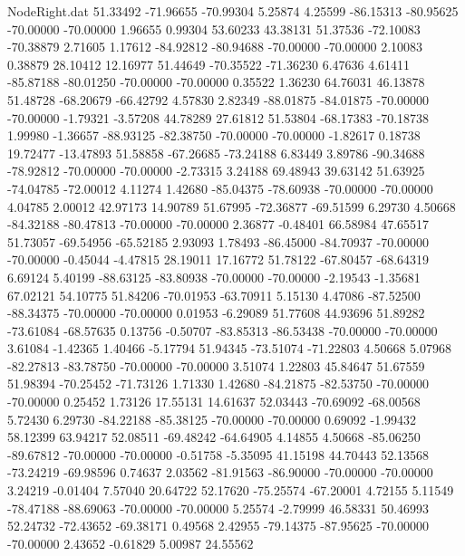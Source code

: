 \begin{filecontents}{NodeRight.dat}
  51.33492  -71.96655  -70.99304     5.25874    4.25599  -86.15313  -80.95625  -70.00000  -70.00000    1.96655    0.99304   53.60233   43.38131
  51.37536  -72.10083  -70.38879     2.71605    1.17612  -84.92812  -80.94688  -70.00000  -70.00000    2.10083    0.38879   28.10412   12.16977
  51.44649  -70.35522  -71.36230     6.47636    4.61411  -85.87188  -80.01250  -70.00000  -70.00000    0.35522    1.36230   64.76031   46.13878
  51.48728  -68.20679  -66.42792     4.57830    2.82349  -88.01875  -84.01875  -70.00000  -70.00000   -1.79321   -3.57208   44.78289   27.61812
  51.53804  -68.17383  -70.18738     1.99980   -1.36657  -88.93125  -82.38750  -70.00000  -70.00000   -1.82617    0.18738   19.72477  -13.47893
  51.58858  -67.26685  -73.24188     6.83449    3.89786  -90.34688  -78.92812  -70.00000  -70.00000   -2.73315    3.24188   69.48943   39.63142
  51.63925  -74.04785  -72.00012     4.11274    1.42680  -85.04375  -78.60938  -70.00000  -70.00000    4.04785    2.00012   42.97173   14.90789
  51.67995  -72.36877  -69.51599     6.29730    4.50668  -84.32188  -80.47813  -70.00000  -70.00000    2.36877   -0.48401   66.58984   47.65517
  51.73057  -69.54956  -65.52185     2.93093    1.78493  -86.45000  -84.70937  -70.00000  -70.00000   -0.45044   -4.47815   28.19011   17.16772
  51.78122  -67.80457  -68.64319     6.69124    5.40199  -88.63125  -83.80938  -70.00000  -70.00000   -2.19543   -1.35681   67.02121   54.10775
  51.84206  -70.01953  -63.70911     5.15130    4.47086  -87.52500  -88.34375  -70.00000  -70.00000    0.01953   -6.29089   51.77608   44.93696
  51.89282  -73.61084  -68.57635     0.13756   -0.50707  -83.85313  -86.53438  -70.00000  -70.00000    3.61084   -1.42365    1.40466   -5.17794
  51.94345  -73.51074  -71.22803     4.50668    5.07968  -82.27813  -83.78750  -70.00000  -70.00000    3.51074    1.22803   45.84647   51.67559
  51.98394  -70.25452  -71.73126     1.71330    1.42680  -84.21875  -82.53750  -70.00000  -70.00000    0.25452    1.73126   17.55131   14.61637
  52.03443  -70.69092  -68.00568     5.72430    6.29730  -84.22188  -85.38125  -70.00000  -70.00000    0.69092   -1.99432   58.12399   63.94217
  52.08511  -69.48242  -64.64905     4.14855    4.50668  -85.06250  -89.67812  -70.00000  -70.00000   -0.51758   -5.35095   41.15198   44.70443
  52.13568  -73.24219  -69.98596     0.74637    2.03562  -81.91563  -86.90000  -70.00000  -70.00000    3.24219   -0.01404    7.57040   20.64722
  52.17620  -75.25574  -67.20001     4.72155    5.11549  -78.47188  -88.69063  -70.00000  -70.00000    5.25574   -2.79999   46.58331   50.46993
  52.24732  -72.43652  -69.38171     0.49568    2.42955  -79.14375  -87.95625  -70.00000  -70.00000    2.43652   -0.61829    5.00987   24.55562

\end{filecontents}
